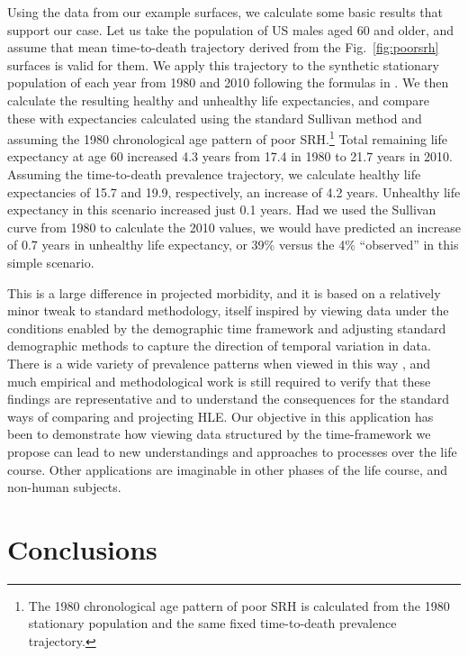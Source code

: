 \documentclass[12pt,oneside,a4paper,doublespacing]{article} %
\theoremstyle{definition}
\begin{document}
Using the data from our example surfaces, we calculate some basic results that support our case. Let us take the population of US males aged 60 and older, and
assume that mean time-to-death trajectory derived from the
Fig.~\ref{fig:poorsrh} surfaces is valid for them.
We apply this trajectory to the synthetic stationary population of each
year from 1980 and 2010  following the formulas in
\cite{vanRaalte2015HLE}. We then calculate the resulting healthy and unhealthy
life expectancies, and compare these with expectancies calculated using the
standard Sullivan method and assuming the 1980 chronological age
pattern of poor SRH.\footnote{The 1980 chronological age pattern of poor SRH is
calculated from the 1980 stationary population and the same fixed time-to-death
prevalence trajectory.} Total remaining life expectancy at
age 60 increased 4.3 years from 17.4 in 1980 to 21.7 years in 2010.
Assuming the time-to-death prevalence trajectory, we calculate
healthy life expectancies of 15.7 and 19.9, respectively, an increase of 4.2 years. Unhealthy life expectancy in this scenario increased just 0.1 years. Had we used the Sullivan curve from 1980 to
calculate the 2010 values, we would have predicted an increase of 0.7 years in
unhealthy life expectancy, or 39\% versus the 4\% ``observed'' in this simple
scenario.

This is a large difference in projected morbidity, and it is based on a
relatively minor tweak to standard methodology, itself inspired by viewing data under the conditions
enabled by the demographic time framework and adjusting standard demographic
methods to capture the direction of temporal variation in data. There is a wide variety
of prevalence patterns when viewed in this way \citep{riffe2016ttd,
wolf2015disability}, and much empirical and methodological work is still required to verify
that these findings are representative and to understand the consequences for
the standard ways of comparing and projecting HLE. Our objective in this application has been
to demonstrate how viewing data structured by the
time-framework we propose can lead to new understandings and approaches to
processes over the life course. Other applications are imaginable in other
phases of the life course, and non-human subjects.

\section{Conclusions}
\end{document}
